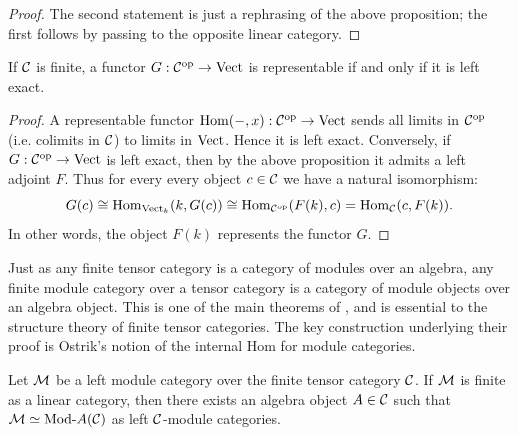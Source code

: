 \documentclass{amsart}
\begin{document}
\begin{proof}
	The second statement is just a rephrasing of the above proposition; the first follows by passing to the opposite linear category.  
\end{proof}


\begin{corollary}
If $\mathcal C$ is finite, a functor $G: \mathcal C^\textrm{op} \to \mathrm{Vect}$ is representable if and only if it is left exact. 
\end{corollary}

\begin{proof}
	A representable functor $\operatorname{Hom}(-, x):\mathcal C^\text{op} \to \mathrm{Vect}$ sends all limits in $\mathcal C^\text{op}$ (i.e. colimits in $\mathcal C$) to limits in $\mathrm{Vect}$. Hence it is left exact. 
%
%		
Conversely, if $G: \mathcal C^\text{op} \to \mathrm{Vect}$ is left exact, then by the above proposition it admits a left adjoint $F$. Thus for every every object $c \in \mathcal C$ we have a natural isomorphism:
	\begin{equation*}
		G(c) \cong \operatorname{Hom}_{\mathrm{Vect}_k}( k, G(c)) \cong \operatorname{Hom}_{\mathcal C^{\mathrm{op}}}( F(k), c) = \operatorname{Hom}_{\mathcal C}(c, F(k) ).
	\end{equation*}
	In other words,  the object $F(k)$ represents the functor $G$. 
\end{proof}

Just as any finite tensor category is a category of modules over an algebra, any finite module category over a tensor category is a category of module objects over an algebra object.  This is one of the main theorems of \cite{EGNO}, and is essential to the structure theory of finite tensor categories.  The key construction underlying their proof is Ostrik's notion of the internal Hom for module categories.

\begin{theorem} \label{thm:EGNO2.11.6} %
	Let $\mathcal M$ be a left module category over the finite tensor category $\mathcal C$. If $\mathcal M$ is finite as a linear category, then there exists an algebra object $A \in \mathcal C$ such that $\cM \simeq \Mod{}{A} (\cC)$ as left $\mathcal C$-module categories. 
\end{theorem}
\end{document}
